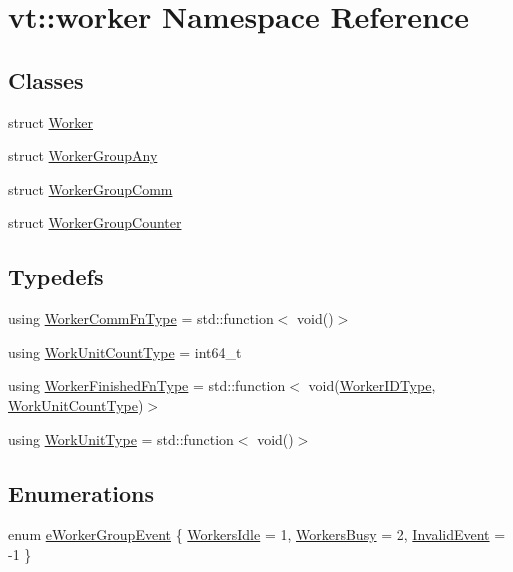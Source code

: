 \hypertarget{namespacevt_1_1worker}{}\section{vt\+:\+:worker Namespace Reference}
\label{namespacevt_1_1worker}
\subsection*{Classes}
\begin{DoxyCompactItemize}
\item 
struct \hyperlink{structvt_1_1worker_1_1_worker}{Worker}
\item 
struct \hyperlink{structvt_1_1worker_1_1_worker_group_any}{Worker\+Group\+Any}
\item 
struct \hyperlink{structvt_1_1worker_1_1_worker_group_comm}{Worker\+Group\+Comm}
\item 
struct \hyperlink{structvt_1_1worker_1_1_worker_group_counter}{Worker\+Group\+Counter}
\end{DoxyCompactItemize}
\subsection*{Typedefs}
\begin{DoxyCompactItemize}
\item 
using \hyperlink{namespacevt_1_1worker_af5cc6dd44a4444b2e5498ca279a9f04d}{Worker\+Comm\+Fn\+Type} = std\+::function$<$ void()$>$
\item 
using \hyperlink{namespacevt_1_1worker_a8080c49350b0520151601a8b24d6c6cf}{Work\+Unit\+Count\+Type} = int64\+\_\+t
\item 
using \hyperlink{namespacevt_1_1worker_ae32a174a5348d27aafe73c2debea1a94}{Worker\+Finished\+Fn\+Type} = std\+::function$<$ void(\hyperlink{namespacevt_a656e362091da17b9b93d0655b36e3392}{Worker\+I\+D\+Type}, \hyperlink{namespacevt_1_1worker_a8080c49350b0520151601a8b24d6c6cf}{Work\+Unit\+Count\+Type})$>$
\item 
using \hyperlink{namespacevt_1_1worker_a59d2fcdafa81fc0af7f921a258e42202}{Work\+Unit\+Type} = std\+::function$<$ void()$>$
\end{DoxyCompactItemize}
\subsection*{Enumerations}
\begin{DoxyCompactItemize}
\item 
enum \hyperlink{namespacevt_1_1worker_abcb798436f1cdc4fab035def5b912d1f}{e\+Worker\+Group\+Event} \{ \hyperlink{namespacevt_1_1worker_abcb798436f1cdc4fab035def5b912d1fa68281452752219b980c9dd7ef992c5bb}{Workers\+Idle} = 1, 
\hyperlink{namespacevt_1_1worker_abcb798436f1cdc4fab035def5b912d1fa8fc7a20c67c347c2e4febd57b5200a35}{Workers\+Busy} = 2, 
\hyperlink{namespacevt_1_1worker_abcb798436f1cdc4fab035def5b912d1fa5fc49f06411bbb619911dce051644416}{Invalid\+Event} = -\/1
 \}
\end{DoxyCompactItemize}


